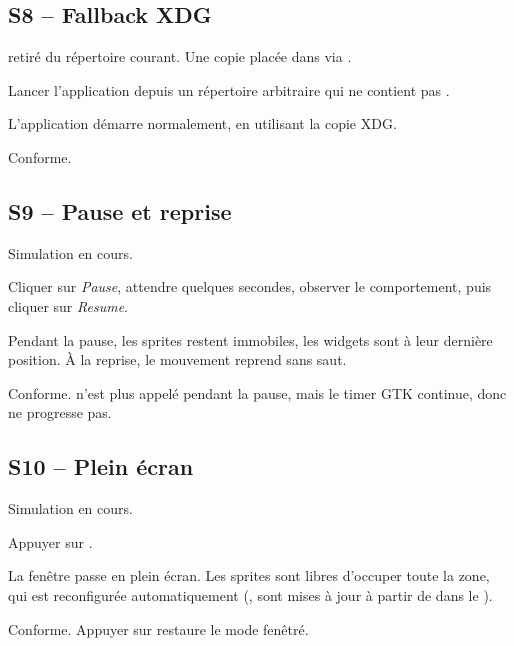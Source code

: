 \subsection{S8 -- Fallback XDG}

\begin{description}[leftmargin=3em]
  \item[Préconditions.]  retiré du
    répertoire courant. Une copie placée dans
     via
    .
  \item[Action.] Lancer l'application depuis un répertoire
    arbitraire qui ne contient pas .
  \item[Attendu.] L'application démarre normalement, en
    utilisant la copie XDG.
  \item[Observé.] Conforme.
\end{description}

\subsection{S9 -- Pause et reprise}

\begin{description}[leftmargin=3em]
  \item[Préconditions.] Simulation en cours.
  \item[Action.] Cliquer sur \emph{Pause}, attendre quelques
    secondes, observer le comportement, puis cliquer sur
    \emph{Resume}.
  \item[Attendu.] Pendant la pause, les sprites restent
    immobiles, les widgets sont à leur dernière position. À la
    reprise, le mouvement reprend sans saut.
  \item[Observé.] Conforme.  n'est plus
    appelé pendant la pause, mais le timer GTK continue, donc
     ne progresse pas.
\end{description}

\subsection{S10 -- Plein écran}

\begin{description}[leftmargin=3em]
  \item[Préconditions.] Simulation en cours.
  \item[Action.] Appuyer sur .
  \item[Attendu.] La fenêtre passe en plein écran. Les sprites
    sont libres d'occuper toute la zone, qui est reconfigurée
    automatiquement (, 
    sont mises à jour à partir de
     dans le ).
  \item[Observé.] Conforme. Appuyer sur  restaure le
    mode fenêtré.
\end{description}

